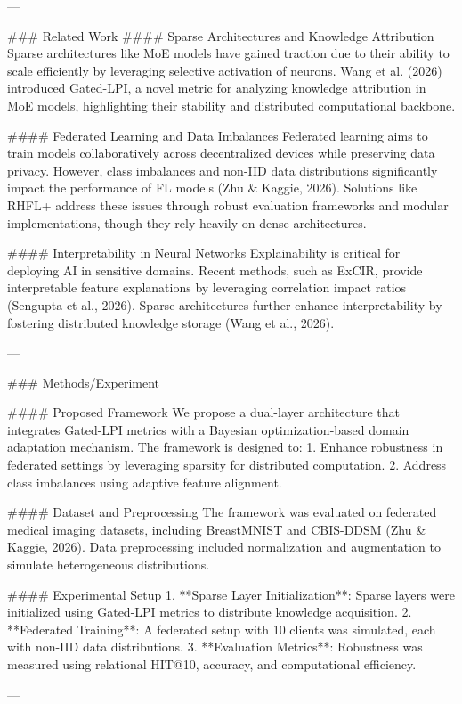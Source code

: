 ---

### Related Work
#### Sparse Architectures and Knowledge Attribution
Sparse architectures like MoE models have gained traction due to their ability to scale efficiently by leveraging selective activation of neurons. Wang et al. (2026) introduced Gated-LPI, a novel metric for analyzing knowledge attribution in MoE models, highlighting their stability and distributed computational backbone.

#### Federated Learning and Data Imbalances
Federated learning aims to train models collaboratively across decentralized devices while preserving data privacy. However, class imbalances and non-IID data distributions significantly impact the performance of FL models (Zhu & Kaggie, 2026). Solutions like RHFL+ address these issues through robust evaluation frameworks and modular implementations, though they rely heavily on dense architectures.

#### Interpretability in Neural Networks
Explainability is critical for deploying AI in sensitive domains. Recent methods, such as ExCIR, provide interpretable feature explanations by leveraging correlation impact ratios (Sengupta et al., 2026). Sparse architectures further enhance interpretability by fostering distributed knowledge storage (Wang et al., 2026).

---

### Methods/Experiment

#### Proposed Framework
We propose a dual-layer architecture that integrates Gated-LPI metrics with a Bayesian optimization-based domain adaptation mechanism. The framework is designed to:
1. Enhance robustness in federated settings by leveraging sparsity for distributed computation.
2. Address class imbalances using adaptive feature alignment.

#### Dataset and Preprocessing
The framework was evaluated on federated medical imaging datasets, including BreastMNIST and CBIS-DDSM (Zhu & Kaggie, 2026). Data preprocessing included normalization and augmentation to simulate heterogeneous distributions.

#### Experimental Setup
1. **Sparse Layer Initialization**: Sparse layers were initialized using Gated-LPI metrics to distribute knowledge acquisition.
2. **Federated Training**: A federated setup with 10 clients was simulated, each with non-IID data distributions.
3. **Evaluation Metrics**: Robustness was measured using relational HIT@10, accuracy, and computational efficiency.

---

